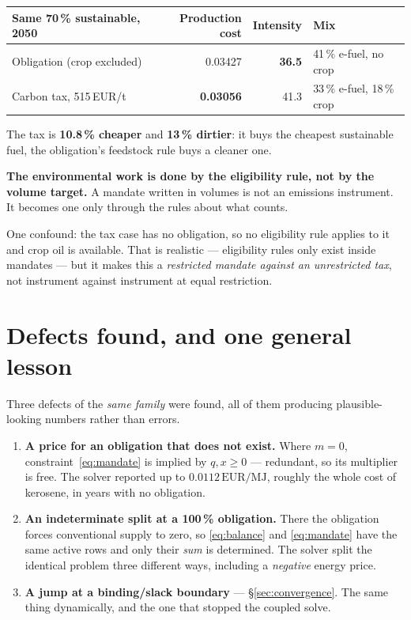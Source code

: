 \documentclass[11pt,a4paper]{article}
\newcommand{\EURMJ}{\ensuremath{\mathrm{EUR}/\mathrm{MJ}}}
\begin{document}
\begin{table}[h]
\centering\small
\begin{tabular}{@{}lrrl@{}}
\toprule
\textbf{Same 70\,\% sustainable, 2050} & \textbf{Production cost} & \textbf{Intensity} & \textbf{Mix} \\
\midrule
Obligation (crop excluded) & 0.03427 & \textbf{36.5} & 41\,\% e-fuel, no crop \\
Carbon tax, 515\,EUR/t & \textbf{0.03056} & 41.3 & 33\,\% e-fuel, 18\,\% crop \\
\bottomrule
\end{tabular}
\end{table}

\noindent The tax is \textbf{10.8\,\% cheaper} and \textbf{13\,\% dirtier}: it buys the
cheapest sustainable fuel, the obligation's feedstock rule buys a cleaner one.

\begin{keybox}
\textbf{The environmental work is done by the eligibility rule, not by the volume
target.} A mandate written in volumes is not an emissions instrument. It becomes one only
through the rules about what counts.
\end{keybox}

\noindent One confound: the tax case has no obligation, so no eligibility rule applies to
it and crop oil is available. That is realistic --- eligibility rules only exist inside
mandates --- but it makes this a \emph{restricted mandate against an unrestricted tax},
not instrument against instrument at equal restriction.

\section{Defects found, and one general lesson}
\label{sec:defects}

Three defects of the \emph{same family} were found, all of them producing
plausible-looking numbers rather than errors.

\begin{enumerate}[leftmargin=*]
  \item \textbf{A price for an obligation that does not exist.} Where $m=0$,
        constraint~\eqref{eq:mandate} is implied by $q,x \ge 0$ --- redundant, so its
        multiplier is free. The solver reported up to $0.0112$\,\EURMJ, roughly the whole
        cost of kerosene, in years with no obligation.
  \item \textbf{An indeterminate split at a 100\,\% obligation.} There the obligation
        forces conventional supply to zero, so \eqref{eq:balance} and \eqref{eq:mandate}
        have the same active rows and only their \emph{sum} is determined. The solver
        split the identical problem three different ways, including a \emph{negative}
        energy price.
  \item \textbf{A jump at a binding/slack boundary} --- \S\ref{sec:convergence}. The same
        thing dynamically, and the one that stopped the coupled solve.
\end{enumerate}
\end{document}
